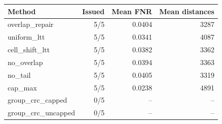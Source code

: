\begin{tabular}{lrrr}
\hline
Method & Issued & Mean FNR & Mean distances \\
\hline
overlap\_repair & 5/5 & 0.0404 & 3287 \\
uniform\_ltt & 5/5 & 0.0341 & 4087 \\
cell\_shift\_ltt & 5/5 & 0.0382 & 3362 \\
no\_overlap & 5/5 & 0.0394 & 3363 \\
no\_tail & 5/5 & 0.0405 & 3319 \\
cap\_max & 5/5 & 0.0238 & 4891 \\
group\_crc\_capped & 0/5 & -- & -- \\
group\_crc\_uncapped & 0/5 & -- & -- \\
\hline
\end{tabular}
